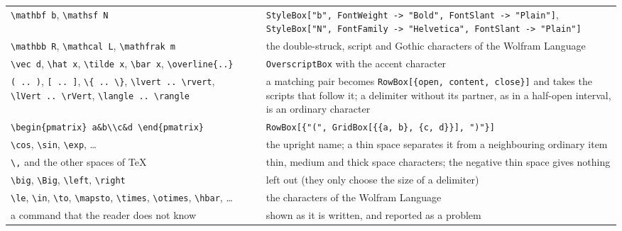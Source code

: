 \documentclass[
  10pt,
]{article}
\begin{document}
\begin{longtable}[]{@{}
  >{\raggedright\arraybackslash}p{}
  >{\raggedright\arraybackslash}p{}@{}}
\texttt{\textbackslash{}mathbf\ b}, \texttt{\textbackslash{}mathsf\ N} &
\texttt{StyleBox{[}"b",\ FontWeight\ -\textgreater{}\ "Bold",\ FontSlant\ -\textgreater{}\ "Plain"{]}},
\texttt{StyleBox{[}"N",\ FontFamily\ -\textgreater{}\ "Helvetica",\ FontSlant\ -\textgreater{}\ "Plain"{]}} \\
\texttt{\textbackslash{}mathbb\ R}, \texttt{\textbackslash{}mathcal\ L},
\texttt{\textbackslash{}mathfrak\ m} & the double-struck, script and
Gothic characters of the Wolfram Language \\
\texttt{\textbackslash{}vec\ d}, \texttt{\textbackslash{}hat\ x},
\texttt{\textbackslash{}tilde\ x}, \texttt{\textbackslash{}bar\ x},
\texttt{\textbackslash{}overline\{..\}} & \texttt{OverscriptBox} with
the accent character \\
\texttt{(\ ..\ )}, \texttt{{[}\ ..\ {]}},
\texttt{\textbackslash{}\{\ ..\ \textbackslash{}\}},
\texttt{\textbackslash{}lvert\ ..\ \textbackslash{}rvert},
\texttt{\textbackslash{}lVert\ ..\ \textbackslash{}rVert},
\texttt{\textbackslash{}langle\ ..\ \textbackslash{}rangle} & a matching
pair becomes \texttt{RowBox{[}\{open,\ content,\ close\}{]}} and takes
the scripts that follow it; a delimiter without its partner, as in a
half-open interval, is an ordinary character \\
\texttt{\textbackslash{}begin\{pmatrix\}\ a\&b\textbackslash{}\textbackslash{}c\&d\ \textbackslash{}end\{pmatrix\}}
&
\texttt{RowBox{[}\{"(",\ GridBox{[}\{\{a,\ b\},\ \{c,\ d\}\}{]},\ ")"\}{]}} \\
\texttt{\textbackslash{}cos}, \texttt{\textbackslash{}sin},
\texttt{\textbackslash{}exp}, \ldots{} & the upright name; a thin space
separates it from a neighbouring ordinary item \\
\texttt{\textbackslash{},} and the other spaces of TeX & thin, medium
and thick space characters; the negative thin space gives nothing \\
\texttt{\textbackslash{}big}, \texttt{\textbackslash{}Big},
\texttt{\textbackslash{}left}, \texttt{\textbackslash{}right} & left out
(they only choose the size of a delimiter) \\
\texttt{\textbackslash{}le}, \texttt{\textbackslash{}in},
\texttt{\textbackslash{}to}, \texttt{\textbackslash{}mapsto},
\texttt{\textbackslash{}times}, \texttt{\textbackslash{}otimes},
\texttt{\textbackslash{}hbar}, \ldots{} & the characters of the Wolfram
Language \\
a command that the reader does not know & shown as it is written, and
reported as a problem \\
\end{longtable}
\end{document}
